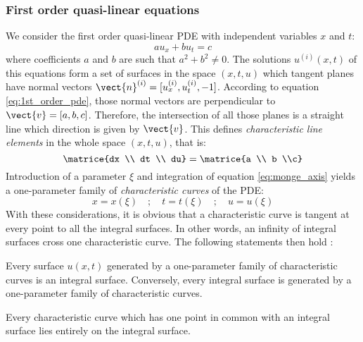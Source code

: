 \subsubsection*{First order quasi-linear equations}
We consider the first order quasi-linear PDE with independent variables $x$ and $t$:
\begin{equation}
  \label{eq:1st_order_pde}
   a u_x + b u_t  = c
\end{equation}
where coefficients $a$ and $b$ are such that $a^2 + b^2 \neq 0$. The solutions $u^{(i)}(x,t)$ of this equations form a set of surfaces in the space $(x,t,u)$ which tangent planes have normal vectors $\vect{n}^{(i)}=[u^{(i)}_x,u^{(i)}_t,-1]$. According to equation \eqref{eq:1st_order_pde}, those normal vectors are perpendicular to $\vect{v}=[a,b,c]$. Therefore, the intersection of all those planes is a straight line which direction is given by $\vect{v}$. This defines \textit{characteristic line elements} in the whole space $(x,t,u)$, that is:
\begin{equation}
  \label{eq:monge_axis}
  \matrice{dx \\ dt \\ du} = \matrice{a \\ b \\c}
\end{equation}
Introduction of a parameter $\xi$ and integration of equation \eqref{eq:monge_axis} yields a one-parameter family of \textit{characteristic curves} of the PDE:
\begin{equation*}
  x=x(\xi) \quad ; \quad t=t(\xi) \quad ; \quad u=u(\xi)
\end{equation*}
With these considerations, it is obvious that a characteristic curve is tangent at every point to all the integral surfaces. In other words, an infinity of integral surfaces cross one characteristic curve. The following statements then hold \cite[p.63-64]{Courant}:
\begin{theorem}
  \label{th:integral_surface_generated}
  Every surface $u(x,t)$ generated by a one-parameter family of characteristic curves is an integral surface. Conversely, every integral surface is generated by a one-parameter family of characteristic curves.
\end{theorem}
\begin{theorem}
  \label{th:charac_in_integral_surface}
  Every characteristic curve which has one point in common with an integral surface lies entirely on the integral surface.
\end{theorem}

